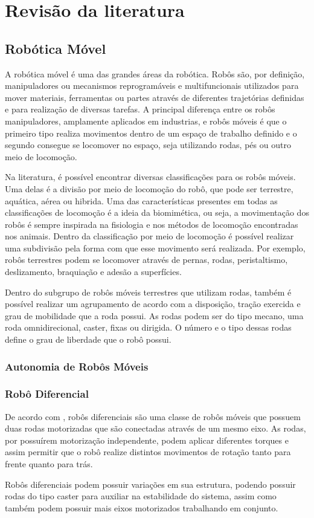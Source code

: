 \chapter{Revisão da literatura}

\section{Robótica Móvel}
A robótica móvel é uma das grandes áreas da robótica. Robôs são, por definição, manipuladores ou mecanismos reprogramáveis e multifuncionais utilizados para mover materiais, ferramentas ou partes através de diferentes trajetórias definidas e para realização de diversas tarefas. A principal diferença entre os robôs manipuladores, amplamente aplicados em industrias, e robôs móveis é que o primeiro tipo realiza movimentos dentro de um espaço de trabalho definido e o segundo consegue se locomover no espaço, seja utilizando rodas, pés ou outro meio de locomoção. \cite{nehmzow2012mobile}
\par
Na literatura, é possível encontrar diversas classificações para os robôs móveis. Uma delas é a divisão por meio de locomoção do robô, que pode ser terrestre, aquática, aérea ou hibrida. Uma das características presentes em todas as classificações de locomoção é a ideia da biomimética, ou seja, a movimentação dos robôs é sempre inspirada na fisiologia e nos métodos de locomoção encontradas nos animais. \cite{russo2020survey} Dentro da classificação por meio de locomoção é possível realizar uma subdivisão pela forma com que esse movimento será realizada. Por exemplo, robôs terrestres podem se locomover através de pernas, rodas, peristaltismo, deslizamento, braquiação e adesão a superfícies. \cite{russo2020survey}
\par
Dentro do subgrupo de robôs móveis terrestres que utilizam rodas, também é possível realizar um agrupamento de acordo com a disposição, tração exercida e grau de mobilidade que a roda possui. As rodas podem ser do tipo mecano, uma roda omnidirecional, caster, fixas ou dirigida. O número e o tipo dessas rodas define o grau de liberdade que o robô possui. \cite{gruber2016} 
\subsection{Autonomia de Robôs Móveis}
\subsection{Robô Diferencial}
De acordo com \cite{dudek2010computational}, robôs diferenciais são uma classe de robôs móveis que possuem duas rodas motorizadas que são conectadas através de um mesmo eixo. As rodas, por possuírem motorização independente, podem aplicar diferentes torques e assim permitir que o robô realize distintos movimentos de rotação tanto para frente quanto para trás. 
\par
Robôs diferenciais podem possuir variações em sua estrutura, podendo possuir rodas do tipo caster para auxiliar na estabilidade do sistema, assim como também podem possuir mais eixos motorizados trabalhando em conjunto. \cite{guarino1995}
\par

